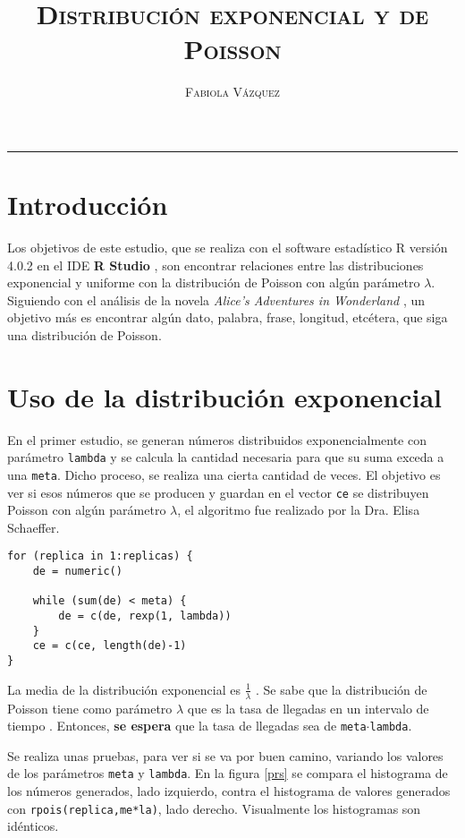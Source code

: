 \documentclass[12pt,letterpaper]{article}
\title{\textsc{Distribución exponencial y de Poisson}}
\author{\textsc{Fabiola Vázquez}}
\begin{document}
\maketitle

\hrule
\section{Introducción}
Los objetivos de este estudio, que se realiza con el software estadístico R versión 4.0.2 \cite{R} en el IDE \textbf{R Studio} \cite{rstudio}, son encontrar relaciones entre las distribuciones exponencial y uniforme con la distribución de Poisson con algún parámetro $\lambda$. Siguiendo con el análisis de la novela \textit{Alice's Adventures in Wonderland} \cite{alice}, un objetivo más es encontrar algún dato, palabra, frase, longitud, etcétera, que siga una distribución de Poisson.  

\section{Uso de la distribución exponencial}
En el primer estudio, se generan números distribuidos exponencialmente con parámetro \texttt{lambda} y se calcula la cantidad necesaria para que su suma exceda a una \texttt{meta}. Dicho proceso, se realiza una cierta cantidad de veces. El objetivo es ver si esos números que se producen y guardan en el vector \texttt{ce} se distribuyen Poisson con algún parámetro $\lambda$, el algoritmo fue realizado por la Dra. Elisa Schaeffer.


\begin{lstlisting}[frame=single]
for (replica in 1:replicas) {
    de = numeric()
    
    while (sum(de) < meta) {
        de = c(de, rexp(1, lambda))
    }
    ce = c(ce, length(de)-1)
}
\end{lstlisting}

La media de la distribución exponencial es $\frac{1}{\lambda}$ \cite{casella}. Se sabe que la distribución de Poisson tiene como parámetro $\lambda$ que es la tasa de llegadas en un intervalo de tiempo \cite{elisaproba}. Entonces, \textbf{se espera} que la tasa de llegadas sea de \texttt{meta}$\cdot$\texttt{lambda}.

Se realiza unas pruebas, para ver si se va por buen camino, variando los valores de los parámetros \texttt{meta} y \texttt{lambda}. En la figura \ref{prs} se compara el histograma de los números generados, lado izquierdo, contra el histograma de valores generados con \texttt{rpois(replica,me*la)}, lado derecho. Visualmente los histogramas son idénticos.
\end{document}
